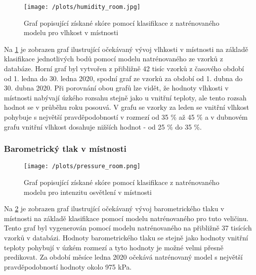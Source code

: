 \begin{figure}[H]
  \centering
  \texttt{[image: /plots/humidity\_room.jpg]}
  \caption{Graf popisující získané skóre pomocí klasifikace z natrénovaného modelu pro vlhkost v místnosti}
  \label{fig:app_humidity_room}
\end{figure}

Na \cref{fig:app_humidity_room} je zobrazen graf ilustrující očekávaný vývoj vlhkosti v místnosti na základě klasifikace jednotlivých bodů pomocí modelu natrénovaného ze vzorků z databáze. Horní graf byl vytvořen z přibližně 42 tisíc vzorků z časového období od 1. ledna do 30. ledna 2020, spodní graf ze vzorků za období od 1. dubna do 30. dubna 2020. Při porovnání obou grafů lze vidět, že hodnoty vlhkosti v místnosti nabývají úzkého rozsahu stejně jako u vnitřní teploty, ale tento rozsah hodnot se v průběhu roku posouvá. V grafu se vzorky za leden se vnitřní vlhkost pohybuje s největší pravděpodobností v rozmezí od 35 \% až 45 \% a v dubnovém grafu vnitřní vlhkost dosahuje nižších hodnot - od 25 \% do 35 \%. 

\subsubsection*{Barometrický tlak v místnosti}

\begin{figure}[H]
  \centering
  \texttt{[image: /plots/pressure\_room.png]}
  \caption{Graf popisující získané skóre pomocí klasifikace z natrénovaného modelu pro intenzitu osvětlení v místnosti}
  \label{fig:app_pressure_room}
\end{figure}

Na \cref{fig:app_pressure_room} je zobrazen graf ilustrující očekávaný vývoj barometrického tlaku v místnosti na základě klasifikace pomocí modelu natrénovaného pro tuto veličinu. Tento graf byl vygenerován pomocí modelu natrénovaného na přibližně 37 tisících vzorků v databázi. Hodnoty barometrického tlaku se stejně jako hodnoty vnitřní teploty pohybují v úzkém rozmezí a tyto hodnoty je možné velmi přesně predikovat. Za období měsíce ledna 2020 očekává natrénovaný model s největší pravděpodobností hodnoty okolo 975 kPa.
